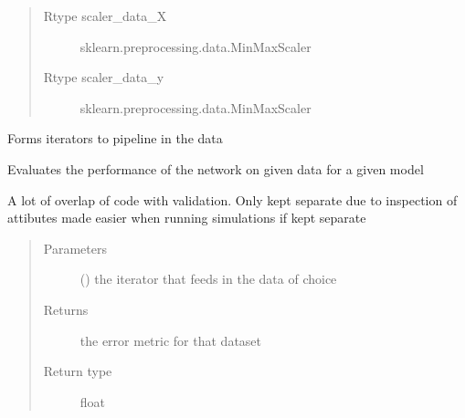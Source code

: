 \documentclass[letterpaper,10pt,english]{sphinxmanual}
\begin{document}
\begin{fulllineitems}
\begin{quote}
\begin{description}
\begin{itemize}
\end{itemize}

\item[{Rtype scaler\_data\_X}] \leavevmode
sklearn.preprocessing.data.MinMaxScaler

\item[{Rtype scaler\_data\_y}] \leavevmode
sklearn.preprocessing.data.MinMaxScaler

\end{description}\end{quote}

\begin{fulllineitems}
\label{\detokenize{index:Src.deeplearning.DeepLearning.create_data_loaders}}
Forms iterators to pipeline in the data

\end{fulllineitems}


\begin{fulllineitems}
\label{\detokenize{index:Src.deeplearning.DeepLearning.evaluate}}
Evaluates the performance of the network
on given data for a given model

A lot of overlap of code with validation. Only kept separate
due to inspection of attibutes made easier when running simulations
if kept separate
\begin{quote}\begin{description}
\item[{Parameters}] \leavevmode
{} () \textendash{} the iterator that feeds in the data of choice

\item[{Returns}] \leavevmode
the error metric for that dataset

\item[{Return type}] \leavevmode
float

\end{description}\end{quote}


\end{fulllineitems}
\end{fulllineitems}
\end{document}
